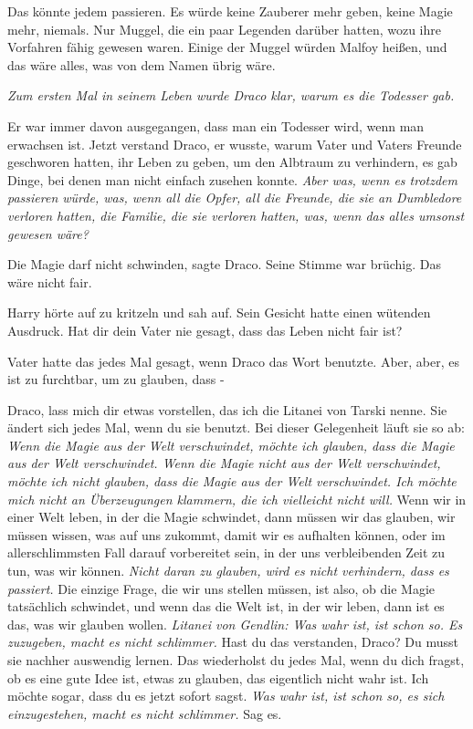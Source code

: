 Das könnte jedem passieren. Es würde keine Zauberer mehr geben, keine Magie
mehr, niemals. Nur Muggel, die ein paar Legenden darüber hatten, wozu ihre
Vorfahren fähig gewesen waren. Einige der Muggel würden Malfoy heißen, und das
wäre alles, was von dem Namen übrig wäre.

\emph{Zum ersten Mal in seinem Leben wurde Draco klar, warum es die Todesser
gab.}

Er war immer davon ausgegangen, dass man ein Todesser wird, wenn man erwachsen
ist. Jetzt verstand Draco, er wusste, warum Vater und Vaters Freunde geschworen
hatten, ihr Leben zu geben, um den Albtraum zu verhindern, es gab Dinge, bei
denen man nicht einfach zusehen konnte. \emph{Aber was, wenn es trotzdem
passieren würde, was, wenn all die Opfer, all die Freunde, die sie an Dumbledore
verloren hatten, die Familie, die sie verloren hatten, was, wenn das alles
umsonst gewesen wäre?}

\glqq{}Die Magie darf nicht schwinden\grqq{}, sagte Draco. Seine Stimme war
brüchig. \glqq{}Das wäre nicht fair.\grqq{}

Harry hörte auf zu kritzeln und sah auf. Sein Gesicht hatte einen wütenden
Ausdruck. \glqq{}Hat dir dein Vater nie gesagt, dass das Leben nicht fair
ist?\grqq{}

Vater hatte das jedes Mal gesagt, wenn Draco das Wort benutzte. \glqq{}Aber,
aber, es ist zu furchtbar, um zu glauben, dass -\grqq{}

\glqq{}Draco, lass mich dir etwas vorstellen, das ich die Litanei von Tarski
nenne. Sie ändert sich jedes Mal, wenn du sie benutzt. Bei dieser Gelegenheit
läuft sie so ab: \emph{Wenn die Magie aus der Welt verschwindet, möchte ich
glauben, dass die Magie aus der Welt verschwindet. Wenn die Magie nicht aus der
Welt verschwindet, möchte ich nicht glauben, dass die Magie aus der Welt
verschwindet. Ich möchte mich nicht an Überzeugungen klammern, die ich
vielleicht nicht will.} Wenn wir in einer Welt leben, in der die Magie
schwindet, dann müssen wir das glauben, wir müssen wissen, was auf uns zukommt,
damit wir es aufhalten können, oder im allerschlimmsten Fall darauf vorbereitet
sein, in der uns verbleibenden Zeit zu tun, was wir können. \emph{Nicht daran zu
glauben, wird es nicht verhindern, dass es passiert.} Die einzige Frage, die wir
uns stellen müssen, ist also, ob die Magie tatsächlich schwindet, und wenn das
die Welt ist, in der wir leben, dann ist es das, was wir glauben wollen.
\emph{Litanei von Gendlin: Was wahr ist, ist schon so. Es zuzugeben, macht es
nicht schlimmer.} Hast du das verstanden, Draco? Du musst sie nachher auswendig
lernen. Das wiederholst du jedes Mal, wenn du dich fragst, ob es eine gute Idee
ist, etwas zu glauben, das eigentlich nicht wahr ist. Ich möchte sogar, dass du
es jetzt sofort sagst. \emph{Was wahr ist, ist schon so, es sich einzugestehen,
macht es nicht schlimmer.} Sag es.\grqq{}

